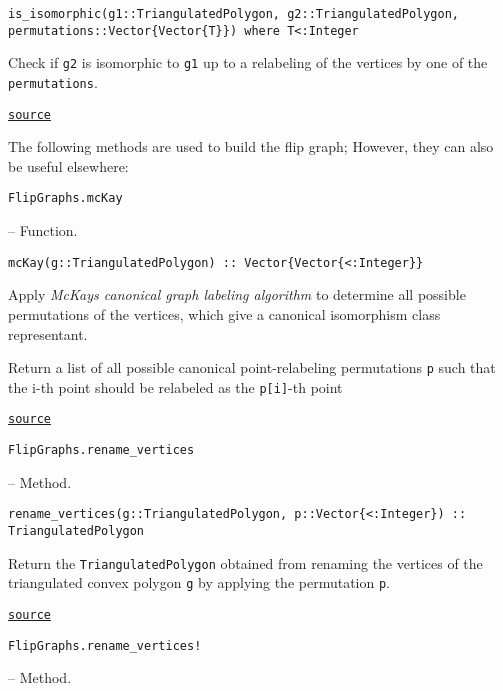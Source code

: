 \begin{adjustwidth}{2em}{0pt}


\begin{verbatim}
is_isomorphic(g1::TriangulatedPolygon, g2::TriangulatedPolygon, permutations::Vector{Vector{T}}) where T<:Integer
\end{verbatim}

Check if \texttt{g2} is isomorphic to \texttt{g1} up to a relabeling of the vertices by one of the \texttt{permutations}.



\href{https://github.com/schto223/FlipGraphs.jl/blob/490c01a7adf74b42f27dda05099165c47ae8133e/src/flipGraphPlanar.jl#L343-L347}{\texttt{source}}


\end{adjustwidth}

The following methods are used to build the flip graph; However, they can also be useful elsewhere:


\hypertarget{1425231861830903434}{\texttt{FlipGraphs.mcKay}}  -- {Function.}

\begin{adjustwidth}{2em}{0pt}


\begin{verbatim}
mcKay(g::TriangulatedPolygon) :: Vector{Vector{<:Integer}}
\end{verbatim}

Apply \emph{McKay{\textquotesingle}s canonical graph labeling algorithm} to determine all possible permutations  of the vertices, which give a canonical isomorphism class representant.

Return a list of all possible canonical point-relabeling permutations \texttt{p} such that the i-th point should be relabeled as the \texttt{p[i]}-th point



\href{https://github.com/schto223/FlipGraphs.jl/blob/490c01a7adf74b42f27dda05099165c47ae8133e/src/flipGraphPlanar.jl#L405-L412}{\texttt{source}}


\end{adjustwidth}
\hypertarget{18413919120035264143}{\texttt{FlipGraphs.rename\_vertices}}  -- {Method.}

\begin{adjustwidth}{2em}{0pt}


\begin{verbatim}
rename_vertices(g::TriangulatedPolygon, p::Vector{<:Integer}) :: TriangulatedPolygon
\end{verbatim}

Return the \texttt{TriangulatedPolygon} obtained from renaming the vertices of the triangulated convex polygon \texttt{g} by applying the permutation \texttt{p}.



\href{https://github.com/schto223/FlipGraphs.jl/blob/490c01a7adf74b42f27dda05099165c47ae8133e/src/flipGraphPlanar.jl#L317-L321}{\texttt{source}}


\end{adjustwidth}
\hypertarget{16314066137346966911}{\texttt{FlipGraphs.rename\_vertices!}}  -- {Method.}

